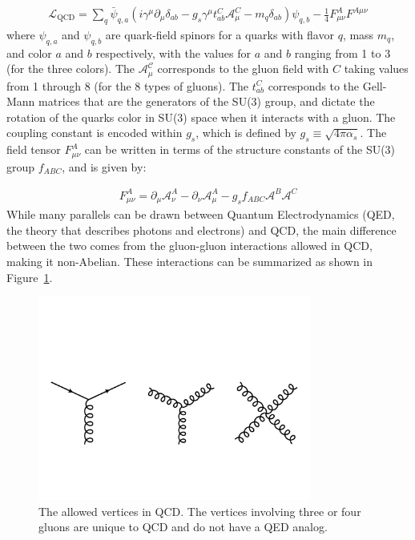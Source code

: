 \begin{align}
\mathcal{{L}}_{\mathrm{QCD}} = \sum_q \bar{\psi}_{q,a} (i \gamma^\mu \partial_\mu \delta_{ab} - g_s \gamma^\mu t_{ab}^C \mathcal{A}_\mu^C - m_q \delta_{ab}) \psi_{q,b} - \frac{1}{4} F_{\mu\nu}^A F^{A \mu\nu}
\end{align}
where $\psi_{q,a}$ and $\psi_{q,b}$ are quark-field spinors for a quarks with flavor $q$, mass $m_q$, and color $a$ and $b$ respectively, with the values for $a$ and $b$ ranging  from 1 to 3 (for the three colors).
The $\mathcal{A_\mu^C}$ corresponds to the gluon field with $C$ taking values from 1 through 8 (for the 8 types of gluons).
The $t_{ab}^C$ corresponds to the Gell-Mann matrices that are the generators of the SU(3) group, and dictate the rotation of the quarks color in SU(3) space when it interacts with a gluon.
The coupling constant is encoded within $g_s$, which is defined by $g_s \equiv \sqrt{4 \pi \alpha_s}$.
The field tensor $F_{\mu\nu}^A$ can be written in terms of the structure constants of the SU(3) group $f_{ABC}$, and is given by:

\begin{align}
F_{\mu\nu}^A = \partial_\mu \mathcal{A}_\nu^A - \partial_\nu \mathcal{A}_\mu^A - g_s f_{ABC} \mathcal{A}^B \mathcal{A}^C
\end{align}
While many parallels can be drawn between Quantum Electrodynamics (QED, the theory that describes photons and electrons) and QCD, the main difference between the two comes from the gluon-gluon interactions allowed in QCD, making it non-Abelian.
These interactions can be summarized as shown in Figure~\ref{fig:qcd_diagrams}.

\begin{figure}[htbp]
\begin{center}
\includegraphics[width=0.8\textwidth]{figures/theory/qcd_diagrams}
\caption{The allowed vertices in QCD.
The vertices involving three or four gluons are unique to QCD and do not have a QED analog.}
\label{fig:qcd_diagrams}
\end{center}
\end{figure}

